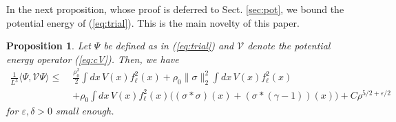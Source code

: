 \documentclass[a4paper,11pt]{article}
\def\cV{\mathcal{V}}
\def\eps{\varepsilon}
\newtheorem{proposition}[theorem]{Proposition}
\numberwithin{equation}{section}
\begin{document}
In the next proposition, whose proof is deferred to Sect. \ref{sec:pot}, we bound the potential energy of (\ref{eq:trial}). This is the main novelty of this paper. 
\begin{proposition}\label{prop:pot}
Let $\Psi$ be defined as in (\ref{eq:trial}) and $\cV$ denote the potential energy operator (\ref{eq:cV}). Then, we have 
\begin{equation}\label{eq:Vpsi}\begin{split} 
\frac{1}{L^3} \langle \Psi, \cV \Psi \rangle \leq \; &\frac{\rho_0^2}{2} \int dx \, V(x) f_\ell^2 (x) + \rho_0 \| \sigma \|_2^2 \int dx \, V(x) f_\ell^2 (x) \\ &+ \rho_0 \int dx \, V(x) f_\ell^2 (x)  \big( (\sigma * \sigma) (x) + (\sigma * (\gamma-1)) (x) \big) + C \rho^{5/2+ \eps/2} 
\end{split} \end{equation}
for $\eps, \delta > 0$ small enough.
\end{proposition} 
\end{document}
